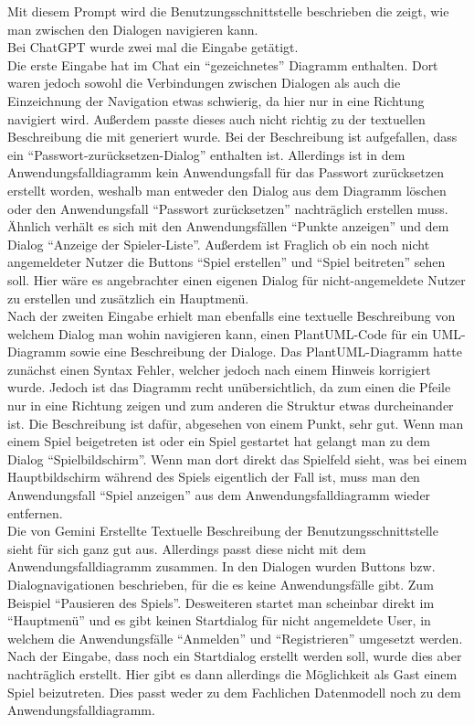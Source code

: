 Mit diesem Prompt wird die Benutzungsschnittstelle beschrieben die zeigt, wie man zwischen den Dialogen navigieren kann.\\

Bei ChatGPT wurde zwei mal die Eingabe getätigt.\\
Die erste Eingabe hat im Chat ein ``gezeichnetes'' Diagramm enthalten. Dort waren jedoch sowohl die Verbindungen zwischen Dialogen als auch 
die Einzeichnung der Navigation etwas schwierig, da hier nur in eine Richtung navigiert wird. Außerdem passte dieses auch nicht richtig zu 
der textuellen Beschreibung die mit generiert wurde. Bei der Beschreibung ist aufgefallen, dass ein ``Passwort-zurücksetzen-Dialog'' enthalten 
ist. Allerdings ist in dem Anwendungsfalldiagramm kein Anwendungsfall für das Passwort zurücksetzen erstellt worden, weshalb man entweder 
den Dialog aus dem Diagramm löschen oder den Anwendungsfall ``Passwort zurücksetzen'' nachträglich erstellen muss. Ähnlich verhält es sich mit 
den Anwendungsfällen ``Punkte anzeigen'' und dem Dialog ``Anzeige der Spieler-Liste''. Außerdem ist Fraglich 
ob ein noch nicht angemeldeter Nutzer die Buttons ``Spiel erstellen'' und ``Spiel beitreten'' sehen soll. Hier wäre es angebrachter einen 
eigenen Dialog für nicht-angemeldete Nutzer zu erstellen und zusätzlich ein Hauptmenü.\\
Nach der zweiten Eingabe erhielt man ebenfalls eine textuelle Beschreibung von welchem Dialog man wohin navigieren kann, einen PlantUML-Code
für ein UML-Diagramm sowie eine Beschreibung der Dialoge. Das PlantUML-Diagramm hatte zunächst einen Syntax Fehler, welcher jedoch nach einem 
Hinweis korrigiert wurde. Jedoch ist das Diagramm recht unübersichtlich, da zum einen die Pfeile nur in eine Richtung zeigen und zum anderen
die Struktur etwas durcheinander ist. Die Beschreibung ist dafür, abgesehen von einem Punkt, sehr gut. Wenn man einem Spiel beigetreten ist oder 
ein Spiel gestartet hat gelangt man zu dem Dialog ``Spielbildschirm''. Wenn man dort direkt das Spielfeld sieht, was bei einem Hauptbildschirm
während des Spiels eigentlich der Fall ist, muss man den Anwendungsfall ``Spiel anzeigen'' aus dem Anwendungsfalldiagramm wieder entfernen.\\

Die von Gemini Erstellte Textuelle Beschreibung der Benutzungsschnittstelle sieht für sich ganz gut aus. Allerdings passt diese nicht mit dem Anwendungsfalldiagramm 
zusammen. In den Dialogen wurden Buttons bzw. Dialognavigationen beschrieben, für die es keine Anwendungsfälle gibt. Zum Beispiel 
``Pausieren des Spiels''. Desweiteren startet man scheinbar direkt im ``Hauptmenü'' und es gibt keinen Startdialog für nicht 
angemeldete User, in welchem die Anwendungsfälle ``Anmelden'' und ``Registrieren'' umgesetzt werden. Nach der Eingabe, dass 
noch ein Startdialog erstellt werden soll, wurde dies aber nachträglich erstellt. Hier gibt es dann allerdings die Möglichkeit als 
Gast einem Spiel beizutreten. Dies passt weder zu dem Fachlichen Datenmodell noch zu dem Anwendungsfalldiagramm.\\

